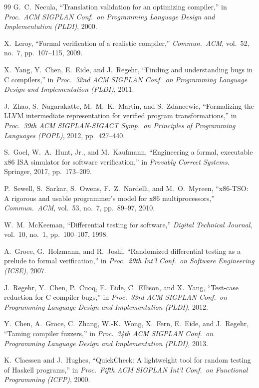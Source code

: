 \documentclass[journal,10pt]{IEEEtran}
\begin{document}
\begin{thebibliography}{99}
G.~C.~Necula, ``Translation validation for an optimizing compiler,''
in \emph{Proc.\ ACM SIGPLAN Conf.\ on Programming Language Design and
Implementation (PLDI)}, 2000.

X.~Leroy, ``Formal verification of a realistic compiler,''
\emph{Commun.\ ACM}, vol.~52, no.~7, pp.~107--115, 2009.

X.~Yang, Y.~Chen, E.~Eide, and J.~Regehr, ``Finding and understanding
bugs in C compilers,'' in \emph{Proc.\ 32nd ACM SIGPLAN Conf.\ on
Programming Language Design and Implementation (PLDI)}, 2011.

J.~Zhao, S.~Nagarakatte, M.~M.~K.~Martin, and S.~Zdancewic,
``Formalizing the LLVM intermediate representation for verified
program transformations,'' in \emph{Proc.\ 39th ACM
SIGPLAN-SIGACT Symp.\ on Principles of Programming Languages (POPL)},
2012, pp.~427--440.

S.~Goel, W.~A.~Hunt, Jr., and M.~Kaufmann, ``Engineering a formal,
executable x86 ISA simulator for software verification,'' in
\emph{Provably Correct Systems}. Springer, 2017, pp.~173--209.

P.~Sewell, S.~Sarkar, S.~Owens, F.~Z.~Nardelli, and M.~O.~Myreen,
``x86-TSO: A rigorous and usable programmer's model for x86
multiprocessors,'' \emph{Commun.\ ACM}, vol.~53, no.~7, pp.~89--97,
2010.

W.~M.~McKeeman, ``Differential testing for software,''
\emph{Digital Technical Journal}, vol.~10, no.~1, pp.~100--107, 1998.

A.~Groce, G.~Holzmann, and R.~Joshi, ``Randomized differential
testing as a prelude to formal verification,'' in \emph{Proc.\ 29th
Int'l Conf.\ on Software Engineering (ICSE)}, 2007.

J.~Regehr, Y.~Chen, P.~Cuoq, E.~Eide, C.~Ellison, and X.~Yang,
``Test-case reduction for C compiler bugs,'' in \emph{Proc.\ 33rd ACM
SIGPLAN Conf.\ on Programming Language Design and Implementation
(PLDI)}, 2012.

Y.~Chen, A.~Groce, C.~Zhang, W.-K.~Wong, X.~Fern, E.~Eide, and
J.~Regehr, ``Taming compiler fuzzers,'' in \emph{Proc.\ 34th ACM
SIGPLAN Conf.\ on Programming Language Design and Implementation
(PLDI)}, 2013.

K.~Claessen and J.~Hughes, ``QuickCheck: A lightweight tool for
random testing of Haskell programs,'' in \emph{Proc.\ Fifth ACM
SIGPLAN Int'l Conf.\ on Functional Programming (ICFP)}, 2000.


\end{thebibliography}
\end{document}
